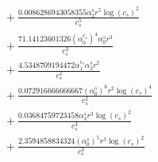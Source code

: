 \documentclass[10pt]{article}
\begin{document}
\begin{align*}
&{}  + \frac{0.0086286943058355 \alpha_{2}^s r^{5} \log{\left(c_{s} \right)}^{2}}{c_{s}^{5}} \\
&{}  + \frac{71.14123601326 \left(\alpha_{0}^{c_s}\right)^{4} \alpha_{0}^s r^{3}}{c_{s}^{3}} \\
&{}  + \frac{4.5348709194472 \alpha_{1}^{c_s} \alpha_{3}^s r^{2}}{c_{s}^{2}} \\
&{}  + \frac{0.072916666666667 \left(\alpha_{0}^s\right)^{6} r^{2} \log{\left(c_{s} \right)}^{4}}{c_{s}^{2}} \\
&{}  + \frac{0.03684759723458 \alpha_{4}^s r^{3} \log{\left(c_{s} \right)}^{2}}{c_{s}^{3}} \\
&{}  + \frac{2.3594858834324 \left(\alpha_{0}^s\right)^{5} r^{3} \log{\left(c_{s} \right)}^{2}}{c_{s}^{3}}
\end{align*}
\end{document}
